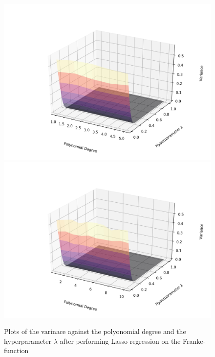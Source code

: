 \documentclass[a4paper,10pt,english]{article}
\begin{document}
\begin{figure}[H]
	\centering 
	\includegraphics[scale=0.47]{../franke_output/part_E_1.png}
	\includegraphics[scale=0.47]{../franke_output/part_E_1_highdeg.png}
	\caption{
		Plots of the varinace against the polyonomial degree and the hyperparameter $\lambda$ after performing Lasso regression on the Franke-function
	}
	\label{part_e1}
\end{figure}
\end{document}
